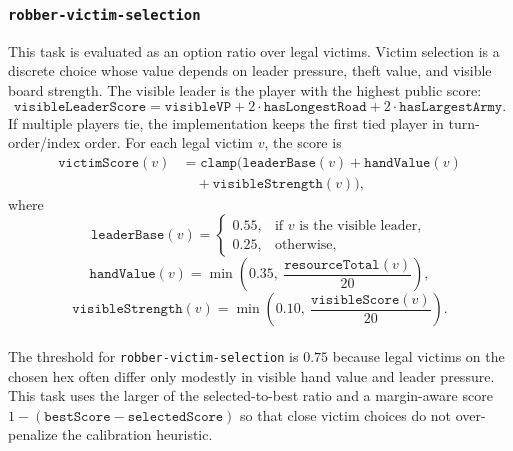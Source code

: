 \documentclass{article}
\begin{document}
\subsubsection{\texttt{robber-victim-selection}}
\label{app:task-robber-victim-selection}
This task is evaluated as an option ratio over legal victims.
Victim selection is a discrete choice whose value depends on leader pressure, theft value, and visible board strength.
The visible leader is the player with the highest public score:
\[
\texttt{visibleLeaderScore}
= \texttt{visibleVP}
+ 2 \cdot \texttt{hasLongestRoad}
+ 2 \cdot \texttt{hasLargestArmy}.
\]
If multiple players tie, the implementation keeps the first tied player in turn-order/index order.
For each legal victim $v$, the score is
\[
\begin{aligned}
\texttt{victimScore}(v)
&= \texttt{clamp}\bigl(
\texttt{leaderBase}(v)
+ \texttt{handValue}(v) \\
&\quad + \texttt{visibleStrength}(v)
\bigr),
\end{aligned}
\]
where
\[
\texttt{leaderBase}(v) =
\begin{cases}
0.55, & \text{if } v \text{ is the visible leader},\\
0.25, & \text{otherwise},
\end{cases}
\]
\[
\texttt{handValue}(v) =
\min\left(0.35,\ \frac{\texttt{resourceTotal}(v)}{20}\right),
\]
\[
\texttt{visibleStrength}(v) =
\min\left(0.10,\ \frac{\texttt{visibleScore}(v)}{20}\right).
\]
\\
The threshold for \texttt{robber-victim-selection} is $0.75$ because legal victims on the chosen hex often differ only modestly in visible hand value and leader pressure. This task uses the larger of the selected-to-best ratio and a margin-aware score $1-(\texttt{bestScore}-\texttt{selectedScore})$ so that close victim choices do not over-penalize the calibration heuristic.
\end{document}
